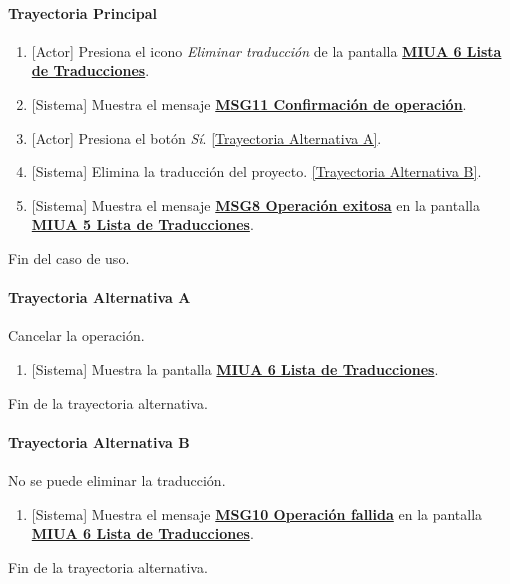 \paragraph{Trayectoria Principal}
	\begin{enumerate}
	    \item {[Actor]} Presiona el icono \textit{Eliminar traducción} de la pantalla \hyperref[fig:MIUA-6]{\bf MIUA 6 Lista de Traducciones}.
	    \item {[Sistema]} Muestra el mensaje \hyperref[MSG11]{\bf MSG11 Confirmación de operación}. 
	    \item {[Actor]} Presiona el botón \textit{Sí}. \hyperref[A-PR-CU1.1.4:TA]{[Trayectoria Alternativa A]}.
	    \item {[Sistema]} Elimina la traducción del proyecto. \hyperref[A-PR-CU1.1.4:TB]{[Trayectoria Alternativa B]}.
	    \item {[Sistema]} Muestra el mensaje \hyperref[fig:MIUA-5]{\bf MSG8 Operación exitosa} en la pantalla \hyperref[fig:MIUA-5]{\bf MIUA 5 Lista de Traducciones}.
	\end{enumerate}
	Fin del caso de uso.

\paragraph{Trayectoria Alternativa A} \label{A-PR-CU1.1.4:TA}
	Cancelar la operación.
	\begin{enumerate}[label=A\arabic*.]
		\item {[Sistema]} Muestra la pantalla \hyperref[fig:MIUA-6]{\bf MIUA 6 Lista de Traducciones}.
	\end{enumerate}
	Fin de la trayectoria alternativa.
	
\paragraph{Trayectoria Alternativa B} \label{A-PR-CU1.1.4:TB}
	No se puede eliminar la traducción.
	\begin{enumerate}[label=B\arabic*.]
		\item {[Sistema]} Muestra el mensaje \hyperref[MSG10]{\bf MSG10 Operación fallida} en la pantalla \hyperref[fig:MIUA-6]{\bf MIUA 6 Lista de Traducciones}.
	\end{enumerate}
	Fin de la trayectoria alternativa.
	
